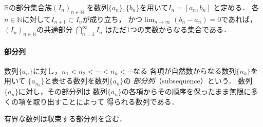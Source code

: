      \begin{coro}
       $\mathbb{R}$の部分集合族$(I_n)_{n \in \mathbb{N}}$
       を数列$\{a_n \} ,  \{ b_n \}$を用いて$I_n = [ a_n , b_n]$
       と定める．
       各$n \in \mathbb{N}$に対して$I_{n+1} \subset I_n$が成り立ち，
       かつ$\displaystyle \lim_{n \to \infty} (b_n -a_n)=0$であれば，
       $(I_n)_{n \in \mathbb{N}}$の共通部分
       $\displaystyle \bigcap_{n=1}^{\infty} I_n$
       はただ1つの実数からなる集合である．
     \end{coro}


    \paragraph{部分列}
     数列$\{ a_n \}$に対し，$n_{1} < n_{2} < \cdots < n_k < \cdots$なる
     各項が自然数からなる数列$\{ n_k \}$を用いて
     $\{ a_ {n_k}\}$と表せる数列を数列$\{ a_n \}$の
     \emph{部分列}（subsequence）という．
     数列$\{ a_n \}$に対し，その部分列は
     数列$\{ a_n \}$の各項からその順序を保ったまま無限に多くの項を取り出すことによって
     得られる数列である．

     \begin{thm} \label{thm:bolzanoweierstrass}
       有界な数列は収束する部分列を含む．
     \end{thm}

